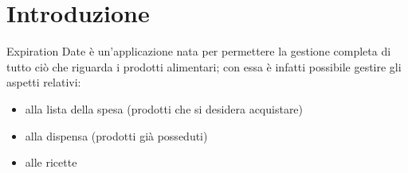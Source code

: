 \chapter{Introduzione}

Expiration Date è un'applicazione nata per permettere la gestione completa di tutto ciò che riguarda i prodotti alimentari; con essa è infatti possibile gestire gli aspetti relativi:
\begin{itemize}

  \item alla lista della spesa (prodotti che si desidera acquistare)
  \item alla dispensa (prodotti già posseduti)
  \item alle ricette
  
\end{itemize}